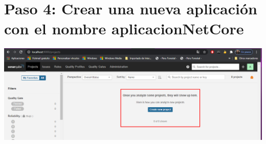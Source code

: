 \section{Paso 4: Crear una nueva aplicación con el nombre aplicacionNetCore } 
\begin{center}
\includegraphics[width=\columnwidth]{images/4}\newline
\end{center}
